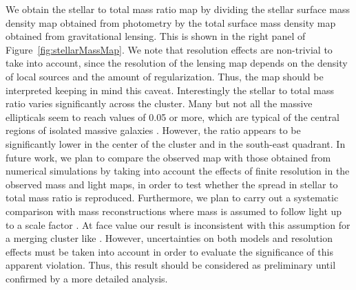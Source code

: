 We obtain the stellar to total mass ratio map by dividing the stellar
surface mass density map obtained from photometry by the total surface
mass density map obtained from gravitational lensing. This is shown in
the right panel of Figure~\ref{fig:stellarMassMap}. We note that
resolution effects are non-trivial to take into account, since the
resolution of the lensing map depends on the density of local sources
and the amount of regularization. Thus, the map should be interpreted
keeping in mind this caveat. Interestingly the stellar to total mass
ratio varies significantly across the cluster. Many but not all the
massive ellipticals seem to reach values of 0.05 or more, which are
typical of the central regions of isolated massive galaxies
\cite[e.g.][]{Gav++07}. However, the ratio appears to be significantly lower in the center of the cluster and in the south-east 
quadrant. In future work, we plan to compare the observed map with
those obtained from numerical simulations by taking into account the
effects of finite resolution in the observed mass and light maps, in
order to test whether the spread in stellar to total mass ratio is
reproduced. Furthermore, we plan to carry out a systematic comparison
with mass reconstructions where mass is assumed to follow light up to
a scale factor \citep{Zit++09}. At face value our result is
inconsistent with this assumption for a merging cluster like \cler. However,
uncertainties on both models and resolution effects must be taken into
account in order to evaluate the significance of this apparent
violation. Thus, this result should be considered as preliminary until
confirmed by a more detailed analysis.

